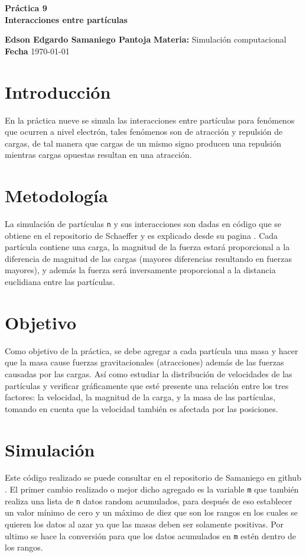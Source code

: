\documentclass[a4paper, 11pt]{article}
\begin{document}
\begin{center}
\LARGE \bf Pr\'actica 9\\ Interacciones entre partículas
\end{center}

\vspace{1cm} 
\noindent\textbf {Edson Edgardo Samaniego Pantoja} \hfill \textbf{Materia:} Simulación computacional 
\hfill \\
\textbf{Fecha} \today  
\vspace{1cm} 

\section{Introducción}
En la práctica nueve se simula las interacciones entre partículas para fenómenos que ocurren a nivel electrón, tales fenómenos son de atracción y repulsión de cargas, de tal manera que cargas de un mismo signo producen una repulsión mientras cargas opuestas resultan en una atracción. 
\section{Metodología}
La simulación de partículas \texttt{n} y sus interacciones son dadas en código que se obtiene en el repositorio de Schaeffer \cite{elisa} y es explicado desde su pagina \cite{dra}. Cada partícula contiene una carga, la magnitud de la fuerza estará proporcional a la diferencia de magnitud de las cargas (mayores diferencias resultando en fuerzas mayores), y además la fuerza será inversamente proporcional a la distancia euclidiana entre las partículas.

\section{Objetivo}
Como objetivo de la práctica, se debe agregar a cada partícula una masa y hacer que la masa cause fuerzas gravitacionales (atracciones) además de las fuerzas causadas por las cargas. Así como estudiar la distribución de velocidades de las partículas y verificar gráficamente que esté presente una relación entre los tres factores: la velocidad, la magnitud de la carga, y la masa de las partículas, tomando en cuenta que la velocidad también es afectada por las posiciones.

\section{Simulación}
Este código realizado se puede consultar en el repositorio de Samaniego en github \cite{Edson}.
El primer cambio realizado o mejor dicho agregado es la variable \texttt{m} que también realiza una lista de \texttt{n} datos random acumulados, para después de eso establecer un valor mínimo de cero y un máximo de diez que son los rangos en los cuales se quieren los datos al azar ya que las masas deben ser solamente positivas. Por ultimo se hace la conversión para que los datos acumulados en \texttt{m} estén dentro de los rangos.
\end{document}
